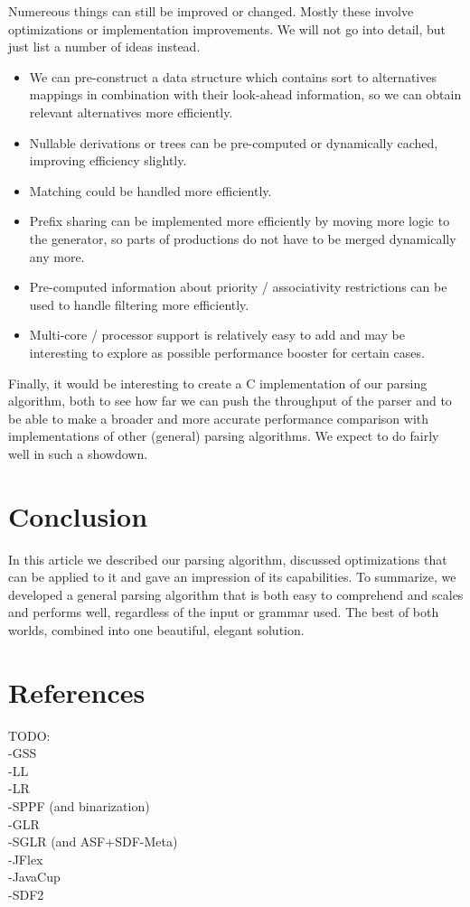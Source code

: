 \documentclass[a4paper,10pt]{article}
\begin{document}
Numereous things can still be improved or changed. Mostly these involve optimizations or implementation improvements. We will not go into detail, but just list a number of ideas instead.

\begin{itemize}
 \setlength{\itemsep}{0pt}
 \setlength{\parskip}{0pt}
 \setlength{\parsep}{0pt}
 
 \item We can pre-construct a data structure which contains sort to alternatives mappings in combination with their look-ahead information, so we can obtain relevant alternatives more efficiently.
 \item Nullable derivations or trees can be pre-computed or dynamically cached, improving efficiency slightly.
 \item Matching could be handled more efficiently.
 \item Prefix sharing can be implemented more efficiently by moving more logic to the generator, so parts of productions do not have to be merged dynamically any more.
 \item Pre-computed information about priority / associativity restrictions can be used to handle filtering more efficiently.
 \item Multi-core / processor support is relatively easy to add and may be interesting to explore as possible performance booster for certain cases.
\end{itemize}

Finally, it would be interesting to create a C implementation of our parsing algorithm, both to see how far we can push the throughput of the parser and to be able to make a broader and more accurate performance comparison with implementations of other (general) parsing algorithms. We expect to do fairly well in such a showdown.

\section{Conclusion}

In this article we described our parsing algorithm, discussed optimizations that can be applied to it and gave an impression of its capabilities. To summarize, we developed a general parsing algorithm that is both easy to comprehend and scales and performs well, regardless of the input or grammar used. The best of both worlds, combined into one beautiful, elegant solution.

\pagebreak
\section{References}

TODO:\\
-GSS\\
-LL\\
-LR\\
-SPPF (and binarization)\\
-GLR\\
-SGLR (and ASF+SDF-Meta)\\
-JFlex\\
-JavaCup\\
-SDF2
\end{document}
